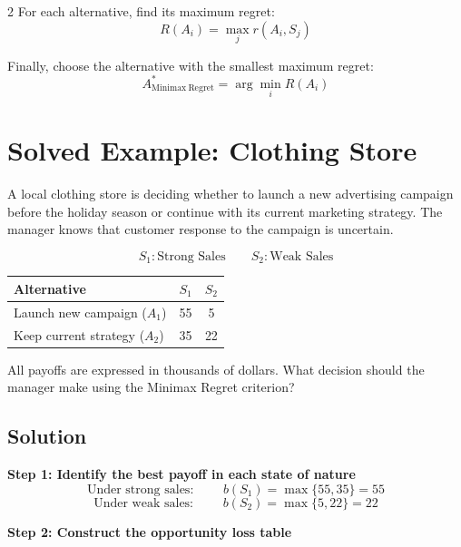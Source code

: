 \begin{multicols}{2}
		For each alternative, find its maximum regret:
		\[
		\boxed{
			R(A_i)
			=
			\max_j r(A_i,S_j)
		}
		\]
		
		Finally, choose the alternative with the smallest maximum regret:
		\[
		\boxed{
			A^*_{\mathrm{Minimax\ Regret}}
			=
			\arg\min_i R(A_i)
		}
		\]
		
		
		
		\section{Solved Example: Clothing Store}
		
		A local clothing store is deciding whether to launch a new advertising
		campaign before the holiday season or continue with its current marketing
		strategy. The manager knows that customer response to the campaign is
		uncertain.
		
		\[ S_1 : \text{Strong Sales} \qquad S_2 : \text{Weak Sales} \]
		\begin{center}
			\renewcommand{\arraystretch}{1.3}
			\small
			\begin{tabular}{lcc}
				\toprule
				Alternative & $S_1$ & $S_2$ \\
				\midrule
				Launch new campaign ($A_1$) & 55 & 5 \\
				Keep current strategy ($A_2$) & 35 & 22 \\
				\bottomrule
			\end{tabular}
		\end{center}
		
		All payoffs are expressed in thousands of dollars. What decision should the manager make using the Minimax Regret criterion?		

		\subsection{Solution}
		\textbf{Step 1: Identify the best payoff in each state of nature}
		\[ \text{Under strong sales: } \qquad
		b(S_1)
		=
		\max\{55,35\}
		=
		55
		\]
		\[ \text{Under weak sales: } \qquad
		b(S_2)
		=
		\max\{5,22\}
		=
		22
		\]
		
		\textbf{Step 2: Construct the opportunity loss table}
		

\end{multicols}
